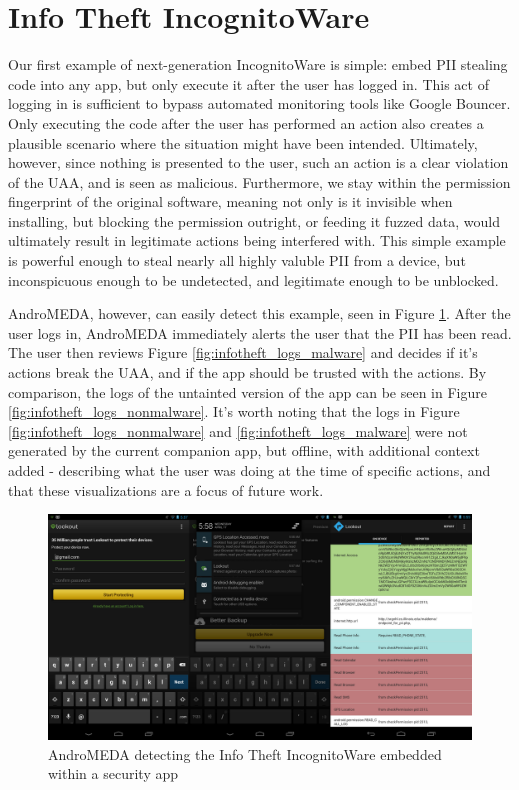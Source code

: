 \section{Info Theft IncognitoWare}
Our first example of next-generation IncognitoWare is simple: embed PII stealing code into any app, but only execute it after the user has logged in. This act of logging in is sufficient to bypass automated monitoring tools like Google Bouncer. Only executing the code after the user has performed an action also creates a plausible scenario where the situation might have been intended. Ultimately, however, since nothing is presented to the user, such an action is a clear violation of the UAA, and is seen as malicious. Furthermore, we stay within the permission fingerprint of the original software, meaning not only is it invisible when installing, but blocking the permission outright, or feeding it fuzzed data, would ultimately result in legitimate actions being interfered with. This simple example is powerful enough to steal nearly all highly valuble PII from a device, but inconspicuous enough to be undetected, and legitimate enough to be unblocked.

AndroMEDA, however, can easily detect this example, seen in Figure \ref{fig:infotheft_visual}. After the user logs in, AndroMEDA immediately alerts the user that the PII has been read. The user then reviews Figure \ref{fig:infotheft_logs_malware} and decides if it's actions break the UAA, and if the app should be trusted with the actions. By comparison, the logs of the untainted version of the app can be seen in Figure \ref{fig:infotheft_logs_nonmalware}. It's worth noting that the logs in Figure \ref{fig:infotheft_logs_nonmalware} and \ref{fig:infotheft_logs_malware} were not generated by the current companion app, but offline, with additional context added - describing what the user was doing at the time of specific actions, and that these visualizations are a focus of future work.

\begin{figure}[h]
\begin{center}
\includegraphics[width=1.0\columnwidth]{figs/lookout_detection}
\caption{AndroMEDA detecting the Info Theft IncognitoWare embedded within a security app }
\label{fig:infotheft_visual}
\end{center}
\end{figure}

